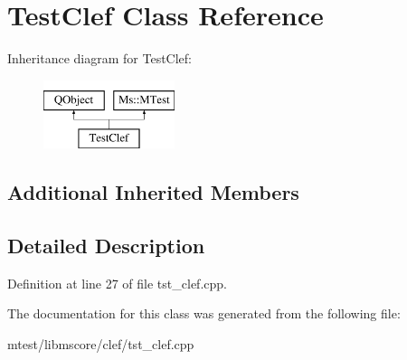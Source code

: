 \hypertarget{class_test_clef}{}\section{Test\+Clef Class Reference}
\label{class_test_clef}
Inheritance diagram for Test\+Clef\+:\begin{figure}[H]
\begin{center}
\leavevmode
\includegraphics[height=2.000000cm]{class_test_clef}
\end{center}
\end{figure}
\subsection*{Additional Inherited Members}


\subsection{Detailed Description}


Definition at line 27 of file tst\+\_\+clef.\+cpp.



The documentation for this class was generated from the following file\+:\begin{DoxyCompactItemize}
\item 
mtest/libmscore/clef/tst\+\_\+clef.\+cpp\end{DoxyCompactItemize}
